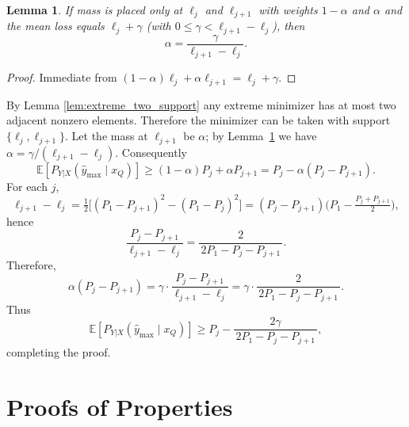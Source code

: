 \documentclass{article} %
\theoremstyle{plain} %
\newtheorem{lemma}[theorem]{Lemma}          %
\begin{document}
\begin{lemma}\label{lem:alpha}
If mass is placed only at $\ell_j$ and $\ell_{j+1}$ with weights $1-\alpha$ and $\alpha$ and the mean loss equals $\ell_j+\gamma$ (with $0\le\gamma<\ell_{j+1}-\ell_j$), then
\[
\alpha=\frac{\gamma}{\ell_{j+1}-\ell_j}.
\]
\end{lemma}

\begin{proof}
Immediate from $(1-\alpha)\ell_j+\alpha\ell_{j+1}=\ell_j+\gamma$.
\end{proof}



By Lemma \ref{lem:extreme_two_support} any extreme minimizer has at most two adjacent nonzero elements. Therefore the minimizer can be taken with support $\{\ell_j,\ell_{j+1}\}$. Let the mass at $\ell_{j+1}$ be $\alpha$; by Lemma~\ref{lem:alpha} we have $\alpha=\gamma/(\ell_{j+1}-\ell_j)$. Consequently
\[
\mathbb{E}\!\left[P_{Y|X}(\hat y_{\max}\mid x_Q)\right]
\ge (1-\alpha)P_j+\alpha P_{j+1}
= P_j - \alpha(P_j-P_{j+1}).
\]
For each $j$,
\[
\ell_{j+1}-\ell_j
=\tfrac12\big[(P_1-P_{j+1})^2-(P_1-P_j)^2\big]
= (P_j-P_{j+1})\Big(P_1-\tfrac{P_j+P_{j+1}}{2}\Big),
\]
hence
\[
\frac{P_j-P_{j+1}}{\ell_{j+1}-\ell_j}
=\frac{2}{\,2P_1-P_j-P_{j+1}\,}.
\]
Therefore,
\[
\alpha(P_j-P_{j+1})
=\gamma\cdot\frac{P_j-P_{j+1}}{\ell_{j+1}-\ell_j}
=\gamma\cdot\frac{2}{\,2P_1-P_j-P_{j+1}\,}.
\]
Thus
\[
\mathbb{E}\!\left[P_{Y|X}(\hat y_{\max}\mid x_Q)\right]
\ge P_j - \frac{2\gamma}{\,2P_1-P_j-P_{j+1}\,},
\]
completing the proof.

\section{Proofs of Properties}
\end{document}
